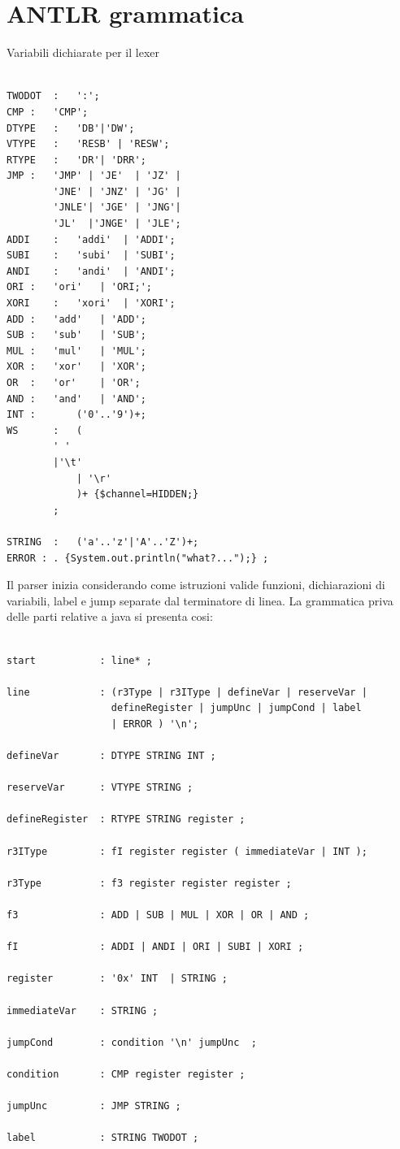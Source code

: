 \section{ANTLR grammatica}
Variabili dichiarate per il lexer
\begin{lstlisting}[style=ANTLR,caption=lexer]
    
TWODOT	:	':';
CMP	:	'CMP';
DTYPE	:	'DB'|'DW';
VTYPE	:	'RESB' | 'RESW';
RTYPE	:	'DR'| 'DRR';
JMP	:	'JMP' | 'JE'  | 'JZ' | 
		'JNE' | 'JNZ' | 'JG' | 
		'JNLE'| 'JGE' | 'JNG'| 
		'JL'  |'JNGE' | 'JLE';
ADDI	:	'addi'	| 'ADDI';
SUBI	:	'subi'	| 'SUBI';
ANDI	:	'andi'	| 'ANDI';
ORI	:	'ori'	| 'ORI;';
XORI	:	'xori'  | 'XORI'; 
ADD	:	'add' 	| 'ADD';
SUB	:	'sub' 	| 'SUB';
MUL	:	'mul'	| 'MUL';
XOR	:	'xor'	| 'XOR';
OR	:	'or' 	| 'OR';
AND	:	'and' 	| 'AND';
INT	:    	('0'..'9')+;
WS      :   (
        ' '
        |'\t'
            | '\r'
            )+ {$channel=HIDDEN;}
        ;

STRING	:	('a'..'z'|'A'..'Z')+;
ERROR : . {System.out.println("what?...");} ;
\end{lstlisting}
\newpage
Il parser inizia considerando come istruzioni valide funzioni, dichiarazioni di variabili, label e jump separate dal terminatore di linea.
La grammatica priva delle parti relative a java si presenta cosi: 
\begin{lstlisting}[style=ANTLR,caption=parser]
    
start           : line* ;

line            : (r3Type | r3IType | defineVar | reserveVar | 
                  defineRegister | jumpUnc | jumpCond | label
                  | ERROR ) '\n';

defineVar       : DTYPE STRING INT ;
	
reserveVar      : VTYPE STRING ;
    
defineRegister	: RTYPE STRING register ;

r3IType	        : fI register register ( immediateVar | INT );

r3Type      	: f3 register register register ;

f3              : ADD | SUB | MUL | XOR | OR | AND ;

fI              : ADDI | ANDI | ORI | SUBI | XORI ; 

register        : '0x' INT  | STRING ;
		
immediateVar    : STRING ;

jumpCond        : condition '\n' jumpUnc  ;

condition       : CMP register register ;

jumpUnc         : JMP STRING ;
	
label 	        : STRING TWODOT ;
\end{lstlisting}
